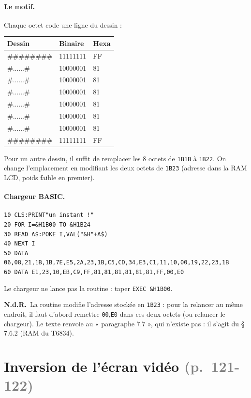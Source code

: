 \documentclass[a4paper,10pt]{article}
\newcommand{\hex}[1]{\texttt{#1}}
\newcommand{\pg}[1]{\texorpdfstring{\textcolor{gray}{\small(p.~#1)}}{}}
\newcommand{\nota}[1]{\textcolor{red!60!black}{\small\textbf{N.d.R.}~#1}}
\begin{document}
\paragraph{Le motif.} Chaque octet code une ligne du dessin :
\begin{center}\small\ttfamily
\begin{tabular}{@{}lll@{}}
\toprule
\normalfont Dessin & \normalfont Binaire & \normalfont Hexa \\
\midrule
\#\#\#\#\#\#\#\# & 11111111 & FF \\
\#......\# & 10000001 & 81 \\
\#......\# & 10000001 & 81 \\
\#......\# & 10000001 & 81 \\
\#......\# & 10000001 & 81 \\
\#......\# & 10000001 & 81 \\
\#......\# & 10000001 & 81 \\
\#\#\#\#\#\#\#\# & 11111111 & FF \\
\bottomrule
\end{tabular}
\end{center}
Pour un autre dessin, il suffit de remplacer les 8 octets de \hex{1B1B} à
\hex{1B22}. On change l'emplacement en modifiant les deux octets de
\hex{1B23} (adresse dans la RAM LCD, poids faible en premier).

\paragraph{Chargeur BASIC.}
\begin{verbatim}
10 CLS:PRINT"un instant !"
20 FOR I=&H1B00 TO &H1B24
30 READ A$:POKE I,VAL("&H"+A$)
40 NEXT I
50 DATA 06,08,21,1B,1B,7E,E5,2A,23,1B,C5,CD,34,E3,C1,11,10,00,19,22,23,1B
60 DATA E1,23,10,EB,C9,FF,81,81,81,81,81,81,FF,00,E0
\end{verbatim}
Le chargeur ne lance pas la routine : taper \texttt{EXEC \&H1B00}.

\nota{La routine modifie l'adresse stockée en \hex{1B23} : pour la relancer
au même endroit, il faut d'abord remettre \hex{00},\hex{E0} dans ces deux
octets (ou relancer le chargeur). Le texte renvoie au « paragraphe 7.7 »,
qui n'existe pas : il s'agit du §\,7.6.2 (RAM du T6834).}

\section{Inversion de l'écran vidéo \pg{121-122}}
\end{document}
